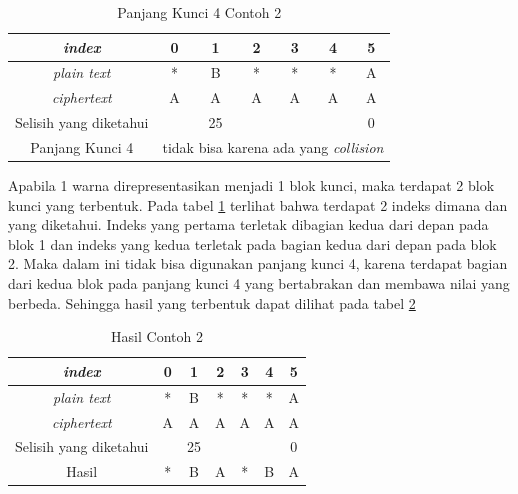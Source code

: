 	\begin{table}[H]
	 	\centering
	 	\setlength{\arrayrulewidth}{.08em}
	 	\begin{tabular}{|c|c|c|c|c|c|c|}\hline
		\textit{index}&0&1&2&3&4&5\\ \hline
	 	\textit{plain text}&\cellcolor{blue!15}*&\cellcolor{blue!15}B&\cellcolor{blue!15}*&\cellcolor{blue!15}*&\cellcolor{green!15}*&\cellcolor{green!15}A\\ \hline
	 	\textit{ciphertext}&\cellcolor{blue!15}A&\cellcolor{blue!15}A&\cellcolor{blue!15}A&\cellcolor{blue!15}A&\cellcolor{green!15}A&\cellcolor{green!15}A\\ \hline
	 	Selisih yang diketahui& &25& & & &0\\ \hline
	 	Panjang Kunci 4 & \multicolumn{6}{c|}{tidak bisa karena ada yang \textit{collision}}\\ \hline
	 	\end{tabular}
	 	\caption{Panjang Kunci 4 Contoh 2}
	 	\label{tab:k4contoh2}
	\end{table}	
	Apabila 1 warna direpresentasikan menjadi 1 blok kunci, maka terdapat 2 blok kunci yang terbentuk. Pada tabel \ref{tab:k4contoh2} terlihat bahwa terdapat 2 indeks dimana \plaintext dan \ciphertext yang diketahui. Indeks yang pertama terletak dibagian kedua dari depan pada blok 1 dan indeks yang kedua terletak pada bagian kedua dari depan pada blok 2. Maka dalam ini tidak bisa digunakan panjang kunci 4, karena terdapat bagian dari kedua blok pada panjang kunci 4 yang bertabrakan dan membawa nilai yang berbeda. Sehingga hasil yang terbentuk dapat dilihat pada tabel \ref{tab:rescontoh2}
	
	\begin{table}[H]
	 	\centering
	 	\setlength{\arrayrulewidth}{.08em}
	 	\begin{tabular}{|c|c|c|c|c|c|c|}\hline
		\textit{index}&0&1&2&3&4&5\\ \hline
	 	\textit{plain text}&*&B&*&*&*&A\\ \hline
	 	\textit{ciphertext}&A&A&A&A&A&A\\ \hline
	 	Selisih yang diketahui& &25& & & &0\\ \hline
	 	Hasil &*&B&A&*&B&A \\ \hline
	 	\end{tabular}
	 	\caption{Hasil Contoh 2}
	 	\label{tab:rescontoh2}
	\end{table}	 
	
